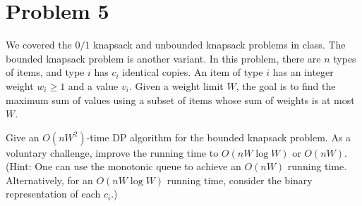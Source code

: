 \section*{Problem 5}
We covered the $0/1$ knapsack and unbounded knapsack problems in class. The bounded knapsack problem is another variant. In this problem, there are $n$ types of items, and type $i$ has $c_i$ identical copies. An item of type $i$ has an integer weight $w_i \geq 1$ and a value $v_i$. Given a weight limit $W$, the goal is to find the maximum sum of values using a subset of items whose sum of weights is at most $W$.

Give an $O(nW^2)$-time DP algorithm for the bounded knapsack problem. As a voluntary challenge, improve the running time to $O(nW\log W)$ or $O(nW)$. (Hint: One can use the monotonic queue to achieve an $O(nW)$ running time. Alternatively, for an $O(nW \log W)$ running time, consider the binary representation of each $c_i$.)


